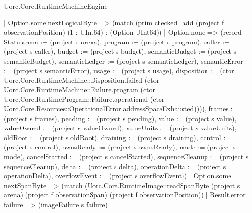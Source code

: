 \begin{lexlean}{Uorc.Core.RuntimeMachineEngine}
\begin{semanticmodule}
{        | Option.some nextLogicalByte => (match (prim checked_add (project f observationPosition) (1 : UInt64) : (Option UInt64))
          | Option.none => (record State {arena := (project s arena), program := (project s program), caller := (project s caller), budget := (project s budget), semanticBudget := (project s semanticBudget), semanticLedger := (project s semanticLedger), semanticError := (project s semanticError), usage := (project s usage), disposition := (ctor Uorc.Core.RuntimeMachine::Disposition.failed (ctor Uorc.Core.RuntimeMachine::Failure.program (ctor Uorc.Core.RuntimeProgram::Failure.operational (ctor Uorc.Core.Resources::OperationalError.addressSpaceExhausted)))), frames := (project s frames), pending := (project s pending), value := (project s value), valueOwned := (project s valueOwned), valueUnits := (project s valueUnits), oldRoot := (project s oldRoot), draining := (project s draining), control := (project s control), ownsReady := (project s ownsReady), mode := (project s mode), cancelStarted := (project s cancelStarted), sequenceCleanup := (project s sequenceCleanup), delta := (project s delta), operationDelta := (project s operationDelta), overflowEvent := (project s overflowEvent)})
          | Option.some nextSpanByte => (match (Uorc.Core.RuntimeImage::readSpanByte (project s arena) (project f observationSpan) (project f observationPosition))
            | Result.error failure => (imageFailure s failure)
}
\end{semanticmodule}
\end{lexlean}
